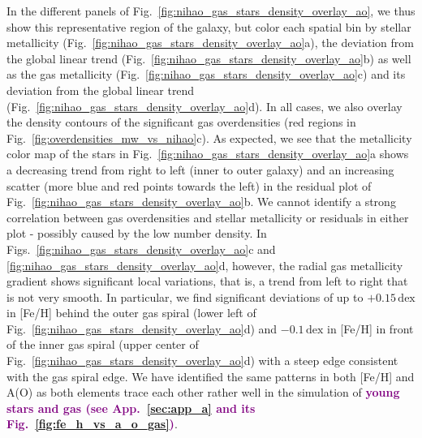\documentclass[twocolumn,apj,numberedappendix,appendixfloats,twocolappendix]{openjournal}
\newcommand{\adjusted}[1]{\textbf{\textcolor{purple}{#1}}}
\begin{document}
\begin{CJK*}{UTF8}{gbsn}
In the different panels of Fig.~\ref{fig:nihao_gas_stars_density_overlay_ao}, we thus show this representative region of the galaxy, but color each spatial bin by stellar metallicity (Fig.~\ref{fig:nihao_gas_stars_density_overlay_ao}a), the deviation from the global linear trend (Fig.~\ref{fig:nihao_gas_stars_density_overlay_ao}b) as well as the gas metallicity (Fig.~\ref{fig:nihao_gas_stars_density_overlay_ao}c) and its deviation from the global linear trend (Fig.~\ref{fig:nihao_gas_stars_density_overlay_ao}d). In all cases, we also overlay the density contours of the significant gas overdensities (red regions in Fig.~\ref{fig:overdensities_mw_vs_nihao}c). As expected, we see that the metallicity color map of the stars in Fig.~\ref{fig:nihao_gas_stars_density_overlay_ao}a shows a decreasing trend from right to left (inner to outer galaxy) and an increasing scatter (more blue and red points towards the left) in the residual plot of Fig.~\ref{fig:nihao_gas_stars_density_overlay_ao}b. We cannot identify a strong correlation between gas overdensities and stellar metallicity or residuals in either plot - possibly caused by the low number density. In Figs.~\ref{fig:nihao_gas_stars_density_overlay_ao}c and \ref{fig:nihao_gas_stars_density_overlay_ao}d, however, the radial gas metallicity gradient shows significant local variations, that is, a trend from left to right that is not very smooth. In particular, we find significant deviations of up to $+0.15\,\mathrm{dex}$ in [Fe/H] behind the outer gas spiral (lower left of Fig.~\ref{fig:nihao_gas_stars_density_overlay_ao}d) and $-0.1\,\mathrm{dex}$ in [Fe/H] in front of the inner gas spiral (upper center of Fig.~\ref{fig:nihao_gas_stars_density_overlay_ao}d) with a steep edge consistent with the gas spiral edge. We have identified the same patterns in both [Fe/H] and A(O) as both elements trace each other rather well in the simulation of \adjusted{young stars and gas (see App.~\ref{sec:app_a} and its Fig.~\ref{fig:fe_h_vs_a_o_gas})}.


\end{CJK*}
\end{document}
